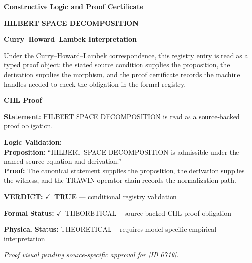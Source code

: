 \clearpage
\begingroup\tzpsupportsetup
\noindent\textbf{\fontsize{10.8pt}{12.8pt}\selectfont [ID 0710] Constructive Logic and Proof Certificate}\par
\noindent\textbf{\fontsize{10pt}{12pt}\selectfont HILBERT SPACE DECOMPOSITION}\par
\vspace{0.45em}
\begingroup
\footnotesize
\setlength{\parskip}{0.22em}
\setlength{\parindent}{0pt}
\noindent\textbf{Curry--Howard--Lambek Interpretation}\par
Under the Curry--Howard--Lambek correspondence, this registry entry is read as a typed proof
object: the stated source condition supplies the proposition, the derivation supplies the
morphism, and the proof certificate records the machine handles needed to check the obligation
in the formal registry.

\vspace{0.45em}
\noindent\textbf{CHL Proof}\par
\textbf{Statement:} HILBERT SPACE DECOMPOSITION is read as a source-backed proof obligation.

\textbf{Logic Validation:}\\
\textbf{Proposition:} ``HILBERT SPACE DECOMPOSITION is admissible under the named source equation and derivation.''\\
\textbf{Proof:} The canonical statement supplies the proposition, the derivation supplies the witness, and the TRAWIN operator chain records the normalization path.

\textbf{VERDICT:} \ensuremath{\checkmark}\ \textbf{TRUE} --- conditional registry validation

\textbf{Formal Status:} \ensuremath{\checkmark}\ THEORETICAL -- source-backed CHL proof obligation

\textbf{Physical Status:} THEORETICAL -- requires model-specific empirical interpretation
\par\vspace{0.45em}
\par
\vfill
\begingroup\footnotesize\itshape
Proof visual pending source-specific approval for [ID 0710].
\par\endgroup
\vfill
\endgroup
\endgroup
